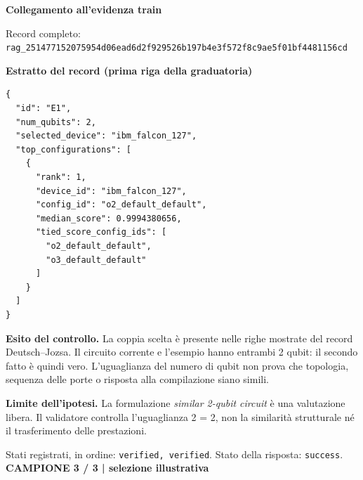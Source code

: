 \documentclass[a4paper,10pt]{article}
\newcommand{\tagline}[1]{{\small\color{ink}\textbf{#1}}\par}
\begin{document}
\textbf{Collegamento all'evidenza train}
\begin{center}\end{center}
{\footnotesize Record completo: \texttt{rag\_251477152075954d06ead6d2f929526b197b4e3f572f8c9ae5f01bf4481156cd}}\par
\textbf{Estratto del record (prima riga della graduatoria)}
\begin{lstlisting}
{
  "id": "E1",
  "num_qubits": 2,
  "selected_device": "ibm_falcon_127",
  "top_configurations": [
    {
      "rank": 1,
      "device_id": "ibm_falcon_127",
      "config_id": "o2_default_default",
      "median_score": 0.9994380656,
      "tied_score_config_ids": [
        "o2_default_default",
        "o3_default_default"
      ]
    }
  ]
}
\end{lstlisting}

\textbf{Esito del controllo.} La coppia scelta è presente nelle righe mostrate del record Deutsch--Jozsa. Il circuito corrente e l'esempio hanno entrambi 2 qubit: il secondo fatto è quindi vero. L'uguaglianza del numero di qubit non prova che topologia, sequenza delle porte o risposta alla compilazione siano simili.\par
{\color{warn}\textbf{Limite dell'ipotesi.}} La formulazione \emph{similar 2-qubit circuit} è una valutazione libera. Il validatore controlla l'uguaglianza 2 = 2, non la similarità strutturale né il trasferimento delle prestazioni.\par
{\small Stati registrati, in ordine: \texttt{verified, verified}. Stato della risposta: \texttt{success}.}
\newpage
\tagline{CAMPIONE 3 / 3 | selezione illustrativa}
\end{document}
